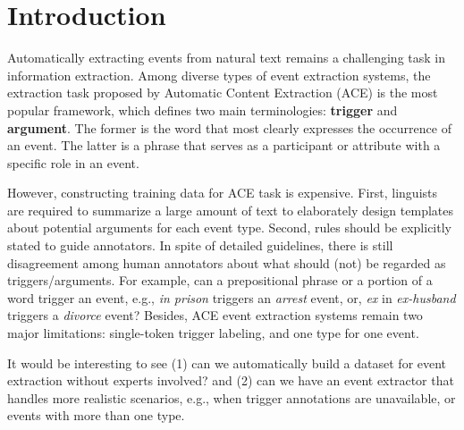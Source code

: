 \section{Introduction}
Automatically extracting events from natural text remains a challenging task in information extraction. Among diverse types of event extraction systems, the extraction task proposed by Automatic Content Extraction (ACE) \cite{doddington2004automatic} is the most popular framework, which defines two main terminologies: \textbf{trigger} and \textbf{argument}. The former is the word that most clearly expresses the occurrence of an event. The latter is a phrase that serves as a participant or attribute with a specific role in an event.

However, constructing training data for ACE task is expensive. First, linguists are required to summarize a large amount of text to elaborately design templates about potential arguments for each event type. Second, rules should be explicitly stated to guide annotators. In spite of detailed guidelines, there is still disagreement among human annotators about what should (not) be regarded as triggers/arguments. 
For example, can a prepositional phrase or a portion of a word trigger an event, e.g., \textit{in prison} triggers an \emph{arrest} event, 
or, \textit{ex} in \textit{ex-husband} triggers a \emph{divorce} event?
Besides, ACE event extraction systems remain two major limitations:   single-token trigger labeling, and one type for one event.

It would be interesting to see (1) can we automatically build a dataset for event extraction without experts involved? 
and (2) can we have an event extractor that handles more realistic scenarios, e.g.,  when trigger annotations are unavailable, or events with more than one type.

